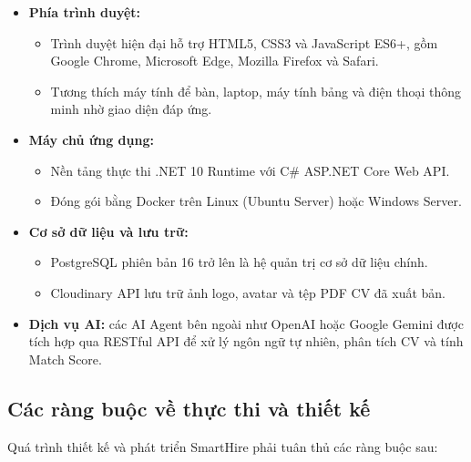 \begin{itemize}
    \item \textbf{Phía trình duyệt:}
    \begin{itemize}
        \item Trình duyệt hiện đại hỗ trợ HTML5, CSS3 và JavaScript ES6+, gồm Google Chrome, Microsoft Edge, Mozilla Firefox và Safari.
        \item Tương thích máy tính để bàn, laptop, máy tính bảng và điện thoại thông minh nhờ giao diện đáp ứng.
    \end{itemize}
    \item \textbf{Máy chủ ứng dụng:}
    \begin{itemize}
        \item Nền tảng thực thi .NET 10 Runtime với C\# ASP.NET Core Web API.
        \item Đóng gói bằng Docker trên Linux (Ubuntu Server) hoặc Windows Server.
    \end{itemize}
    \item \textbf{Cơ sở dữ liệu và lưu trữ:}
    \begin{itemize}
        \item PostgreSQL phiên bản 16 trở lên là hệ quản trị cơ sở dữ liệu chính.
        \item Cloudinary API lưu trữ ảnh logo, avatar và tệp PDF CV đã xuất bản.
    \end{itemize}
    \item \textbf{Dịch vụ AI:} các AI Agent bên ngoài như OpenAI hoặc Google Gemini được tích hợp qua RESTful API để xử lý ngôn ngữ tự nhiên, phân tích CV và tính Match Score.
\end{itemize}

\subsection{Các ràng buộc về thực thi và thiết kế}

\noindent Quá trình thiết kế và phát triển SmartHire phải tuân thủ các ràng buộc sau:

